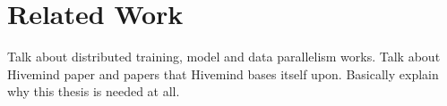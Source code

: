 \chapter{Related Work}\label{chapter:related-work}
Talk about distributed training, model and data parallelism works.
Talk about Hivemind paper and papers that Hivemind bases itself upon.
Basically explain why this thesis is needed at all.

